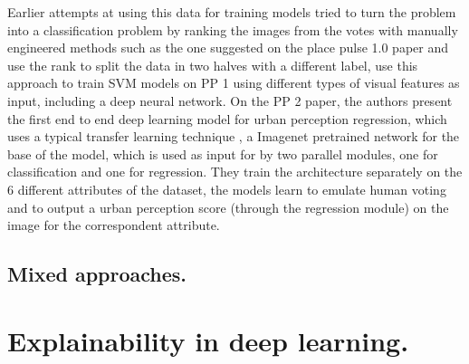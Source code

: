 Earlier attempts at using this data for training models tried to turn the problem into a classification problem
by  ranking the images from the votes with manually engineered methods such as the one suggested on the
place pulse 1.0 paper \cite{hidalgo_inequality} and use the rank to split the data in two halves with a different
label,  use this approach to train SVM models on PP 1 using different types of visual features as input,
including a deep neural network. On the PP 2 paper, the authors present the first end to end deep learning model for
urban perception regression, which uses a typical transfer learning technique \cite{survey_transfer}, a
Imagenet \cite{imagenet} pretrained  network for the base of the model, which is used as input
for by two parallel modules, one for classification and one for regression. They train the architecture
separately on the 6 different attributes of the dataset, the models learn to emulate human voting and
to output a urban perception score (through the regression module) on the image for the correspondent attribute.

\subsection{Mixed approaches.}

\section{ Explainability in deep learning.}